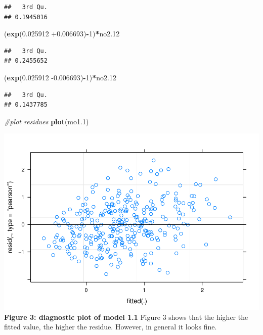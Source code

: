 \documentclass[12pt,]{article}
\newenvironment{Shaded}{\begin{snugshade}}{\end{snugshade}}
\newcommand{\CommentTok}[1]{\textcolor[rgb]{0.56,0.35,0.01}{\textit{#1}}}
\newcommand{\DecValTok}[1]{\textcolor[rgb]{0.00,0.00,0.81}{#1}}
\newcommand{\FloatTok}[1]{\textcolor[rgb]{0.00,0.00,0.81}{#1}}
\newcommand{\KeywordTok}[1]{\textcolor[rgb]{0.13,0.29,0.53}{\textbf{#1}}}
\newcommand{\NormalTok}[1]{#1}
\newcommand{\OperatorTok}[1]{\textcolor[rgb]{0.81,0.36,0.00}{\textbf{#1}}}
\begin{document}
\begin{verbatim}
##   3rd Qu. 
## 0.1945016
\end{verbatim}

\begin{Shaded}
\begin{Highlighting}[]
\NormalTok{(}\KeywordTok{exp}\NormalTok{(}\FloatTok{0.025912} \FloatTok{+0.006693}\NormalTok{)}\OperatorTok{-}\DecValTok{1}\NormalTok{)}\OperatorTok{*}\NormalTok{no2}\FloatTok{.12}
\end{Highlighting}
\end{Shaded}

\begin{verbatim}
##   3rd Qu. 
## 0.2455652
\end{verbatim}

\begin{Shaded}
\begin{Highlighting}[]
\NormalTok{(}\KeywordTok{exp}\NormalTok{(}\FloatTok{0.025912} \FloatTok{-0.006693}\NormalTok{)}\OperatorTok{-}\DecValTok{1}\NormalTok{)}\OperatorTok{*}\NormalTok{no2}\FloatTok{.12}
\end{Highlighting}
\end{Shaded}

\begin{verbatim}
##   3rd Qu. 
## 0.1437785
\end{verbatim}

\begin{Shaded}
\begin{Highlighting}[]
\CommentTok{#plot residues}
\KeywordTok{plot}\NormalTok{(mo1}\FloatTok{.1}\NormalTok{)}
\end{Highlighting}
\end{Shaded}

\includegraphics{872_files/figure-latex/unnamed-chunk-4-1.pdf}
\center \textbf{Figure 3: diagnostic plot of model 1.1} \center Figure 3
shows that the higher the fitted value, the higher the residue. However,
in general it looks fine.
\end{document}
